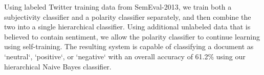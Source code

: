 Using labeled Twitter training data from SemEval-2013, we train both a subjectivity classifier and a polarity classifier separately, and then combine
 the two into a single hierarchical classifier. Using additional unlabeled data
 that is believed to contain sentiment, we allow the polarity classifier to
 continue learning using self-training. The resulting system is capable of
 classifying a document as `neutral`, `positive`, or `negative` with an overall
 accuracy of 61.2\% using our hierarchical Naive Bayes classifier.

